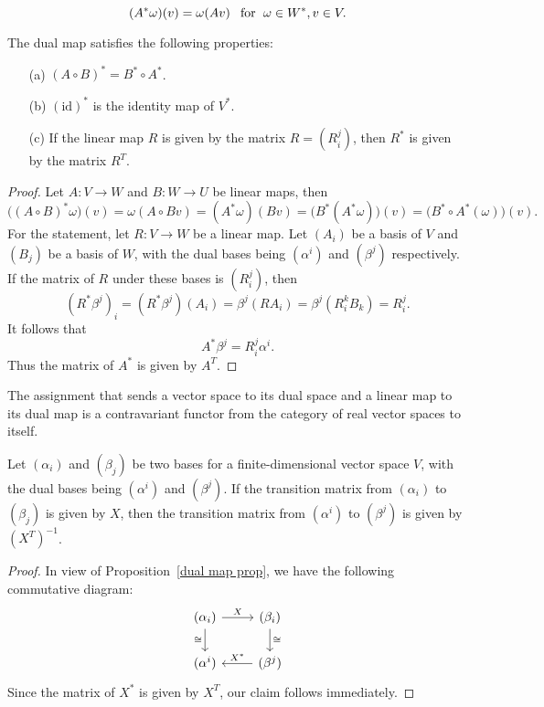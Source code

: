 \[(A^*\omega)(v)=\omega(Av)\hspace{8pt}\text{for}\hspace{6pt} \omega\in W^*,v\in V.\]
\begin{proposition}\label{dual map prop}
The dual map satisfies the following properties:
\begin{itemize}
\item[(a)] $(A\circ B)^*=B^*\circ A^*$.
\item[(b)] $(\mathrm{id})^*$ is the identity map of $V^*$.
\item[(c)] If the linear map $R$ is given by the matrix $R=(R_i^j)$, then $R^*$ is given by the matrix $R^T$.
\end{itemize}
\end{proposition}
\begin{proof}
Let $A:V\to W$ and $B:W\to U$ be linear maps, then
\[\big((A\circ B)^*\omega\big)(v)=\omega(A\circ Bv)=(A^*\omega)(Bv)=\big(B^*(A^*\omega)\big)(v)=\big(B^*\circ A^*(\omega)\big)(v).\]
For the statement, let $R:V\to W$ be a linear map. Let $(A_i)$ be a basis of $V$ and $(B_j)$ be a basis of $W$, with the dual bases being $(\alpha^i)$ and $(\beta^j)$ respectively. If the matrix of $R$ under these bases is $(R_i^j)$, then
\[(R^*\beta^j)_i=(R^*\beta^j)(A_i)=\beta^j(RA_i)=\beta^j(R_i^kB_k)=R_i^j.\]
It follows that
\[A^*\beta^j=R_i^j\alpha^i.\]
Thus the matrix of $A^*$ is given by $A^T$.
\end{proof}
\begin{corollary}
The assignment that sends a vector space to its dual space and a linear map to its dual map is a contravariant functor from the category of real vector spaces to itself.
\end{corollary}
\begin{corollary}
Let $(\alpha_i)$ and $(\beta_j)$ be two bases for a finite-dimensional vector space $V$, with the dual bases being $(\alpha^i)$ and $(\beta^j)$. If the transition matrix from $(\alpha_i)$ to $(\beta_j)$ is given by $X$, then the transition matrix from $(\alpha^i)$ to $(\beta^j)$ is given by $(X^T)^{-1}$.
\end{corollary}
\begin{proof}
In view of Proposition~\ref{dual map prop}, we have the following commutative diagram:
\[\begin{tikzcd}
(\alpha_i)\ar[r,"X"]\ar[d,swap,"\cong"]&(\beta_i)\ar[d,"\cong"]\\
(\alpha^i)&(\beta^j)\ar[l,swap,"X^*"]
\end{tikzcd}\]
Since the matrix of $X^*$ is given by $X^T$, our claim follows immediately.
\end{proof}
